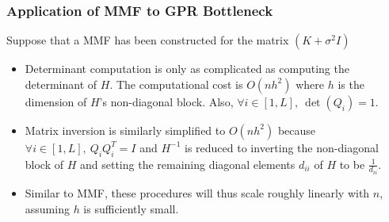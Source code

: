 \documentclass{beamer}
\begin{document}
\begin{frame}
\frametitle{Application of MMF to GPR Bottleneck}
Suppose that a MMF has been constructed for the matrix $(K+\sigma^2I)$
\begin{itemize}
\item  Determinant computation is only as complicated as computing the determinant of $H$. The computational cost is $O(nh^2)$ where $h$ is the dimension of $H$'s non-diagonal block. Also, $\forall i\in [1,L], \ \det(Q_i)=1$.
\item Matrix inversion is similarly simplified to $O(nh^2)$ because $\forall i \in [1,L], \ Q_iQ_i^T = I$ and $H^{-1}$ is reduced to inverting the non-diagonal block of $H$ and setting the remaining diagonal elements $d_{ii}$ of $H$ to be $\frac{1}{d_{ii}}$.
\item Similar to MMF, these procedures will thus scale roughly linearly with $n$, assuming $h$ is sufficiently small.
\end{itemize}
\end{frame}
\end{document}
